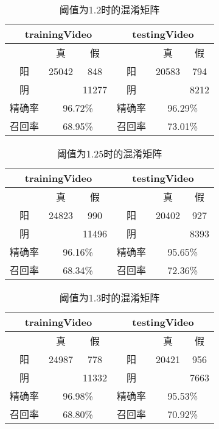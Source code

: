 \documentclass{article}
\begin{document}
\begin{table}[]
\centering
\begin{tabular}{|c|c|c|c|c|c|}
\hline
\multicolumn{3}{|c|}{trainingVideo} & \multicolumn{3}{c|}{testingVideo} \\ \hline
 & 真 & 假 &  & 真 & 假 \\ \hline
阳 & 25042 & 848 & 阳 & 20583 & 794 \\ \hline
阴 &  & 11277 & 阴 &  & 8212 \\ \hline
精确率 & \multicolumn{2}{c|}{96.72\%} & 精确率 & \multicolumn{2}{c|}{96.29\%} \\ \hline
召回率 & \multicolumn{2}{c|}{68.95\%} & 召回率 & \multicolumn{2}{c|}{73.01\%} \\ \hline
\end{tabular}
\caption{阈值为1.2时的混淆矩阵}
\end{table}

\begin{table}[]
\centering
\begin{tabular}{|c|c|c|c|c|c|}
\hline
\multicolumn{3}{|c|}{trainingVideo} & \multicolumn{3}{c|}{testingVideo} \\ \hline
 & 真 & 假 &  & 真 & 假 \\ \hline
阳 & 24823 & 990 & 阳 & 20402 & 927 \\ \hline
阴 &  & 11496 & 阴 &  & 8393 \\ \hline
精确率 & \multicolumn{2}{c|}{96.16\%} & 精确率 & \multicolumn{2}{c|}{95.65\%} \\ \hline
召回率 & \multicolumn{2}{c|}{68.34\%} & 召回率 & \multicolumn{2}{c|}{72.36\%} \\ \hline
\end{tabular}
\caption{阈值为1.25时的混淆矩阵}
\end{table}

\begin{table}[]
\centering
\begin{tabular}{|c|c|c|c|c|c|}
\hline
\multicolumn{3}{|c|}{trainingVideo} & \multicolumn{3}{c|}{testingVideo} \\ \hline
 & 真 & 假 &  & 真 & 假 \\ \hline
阳 & 24987 & 778 & 阳 & 20421 & 956 \\ \hline
阴 &  & 11332 & 阴 &  & 7663 \\ \hline
精确率 & \multicolumn{2}{c|}{96.98\%} & 精确率 & \multicolumn{2}{c|}{95.53\%} \\ \hline
召回率 & \multicolumn{2}{c|}{68.80\%} & 召回率 & \multicolumn{2}{c|}{70.92\%} \\ \hline
\end{tabular}
\caption{阈值为1.3时的混淆矩阵}
\end{table}
\end{document}
